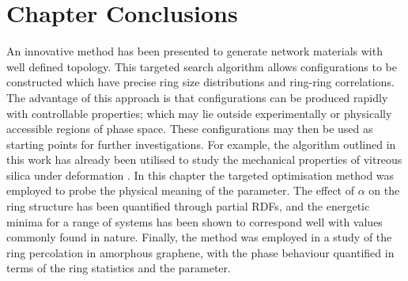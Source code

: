 \section{Chapter Conclusions}

An innovative method has been presented to generate \td{} network materials with well defined topology. 
This targeted \mc{} search algorithm allows configurations to be constructed which have precise ring size distributions and ring\--ring correlations.
The advantage of this approach is that configurations can be produced rapidly with controllable properties; which may lie outside experimentally or physically accessible regions of phase space.
These configurations may then be used as starting points for further investigations.
For example, the algorithm outlined in this work has already been utilised to study the mechanical properties of vitreous silica under deformation \cite{Bamer2020,Ebrahem2020a}.
In this chapter the targeted optimisation method was employed to probe the physical meaning of the \aw{} parameter.
The effect of $\alpha$ on the ring structure has been quantified through partial RDFs, and the energetic minima for a range of systems has been shown to correspond well with values commonly found in nature.
Finally, the method was employed in a study of the ring percolation in amorphous graphene, with the phase behaviour quantified in terms of the ring statistics and the \aw{} parameter.

 





